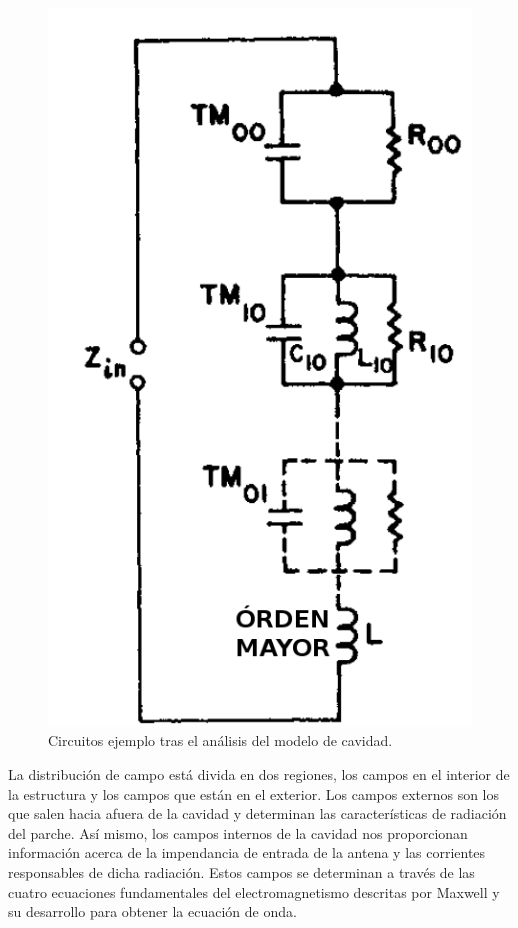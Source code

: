 \begin{figure}[!htb]
    \centering
    \includegraphics[scale=0.25]{./ContextoTecnologico/ejemplo_cavidad}
    \caption{Circuitos ejemplo tras el análisis del modelo de cavidad.}
    \label{fig:fig2.9}
\end{figure}

La distribución de campo está divida en dos regiones, los campos en el interior de la estructura y los campos que están en el exterior. Los campos externos son los que salen hacia afuera de la cavidad y determinan las características de radiación del parche. Así mismo, los campos internos de la cavidad nos proporcionan información acerca de la impendancia de entrada de la antena y las corrientes responsables de dicha radiación. Estos campos se determinan a través de las cuatro ecuaciones fundamentales del electromagnetismo descritas por Maxwell y su desarrollo para obtener la ecuación de onda.


